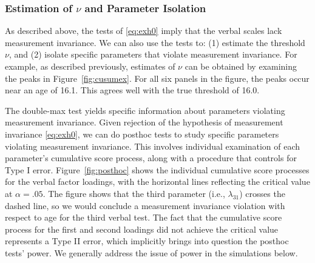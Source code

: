 \documentclass[man]{apa}
\begin{document}
\subsubsection{Estimation of $\nu$ and Parameter Isolation}
As described above, the tests of \eqref{eq:exh0} imply that the 
verbal scales lack measurement invariance.  
We can also use the tests to: (1) estimate the 
threshold $\nu$, and (2) isolate specific parameters that violate
measurement invariance.  
For example, as described previously, estimates of $\nu$ can be obtained by
examining the peaks in Figure~\ref{fig:cusumex}.  For all six panels
in the figure, the peaks occur near an age of 16.1.  This agrees well
with the true threshold of 16.0.

The double-max test yields specific information about 
parameters violating measurement invariance.  Given
rejection of the hypothesis of measurement invariance \eqref{eq:exh0},
we can do posthoc 
tests to study specific parameters violating measurement invariance.
This involves individual examination of each parameter's cumulative
score process,
along with a procedure that controls for Type I error.  
Figure~\ref{fig:posthoc} shows the individual cumulative score processes for the
verbal factor loadings, with the horizontal lines reflecting the
critical value at $\alpha=.05$.
  The figure
shows that the third parameter (i.e., $\lambda_{31}$) crosses the
dashed line, so we would conclude a measurement 
invariance violation with respect to age for the third
verbal test.  The fact that the cumulative score process for the first
and second loadings did not achieve the critical value represents a Type II
error, which implicitly brings into question the posthoc tests' power.  We
generally address the issue of power in the simulations below.
\end{document}

